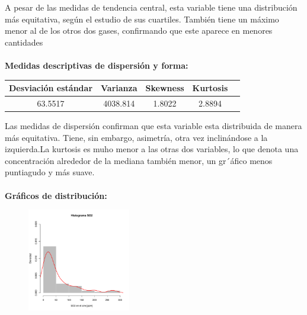 \documentclass[11pt]{article}
\begin{document}
A pesar de las medidas de tendencia central, esta variable tiene una distribución más equitativa, según el estudio de sus cuartiles. También tiene un máximo menor al de los otros dos gases, confirmando que este aparece en menores cantidades
\\
\\
\textbf{Medidas descriptivas de dispersión y forma:}

\begin{center}
\begin{tabular}{|c|c|c|c|c|}
    \hline
    Desviación estándar  & Varianza & Skewness & Kurtosis\\ \hline
    63.5517 & 4038.814 & 1.8022 & 2.8894\\
    \hline
\end{tabular}
\end{center}

Las medidas de dispersión confirman que esta variable esta distribuida de manera más equitativa. Tiene, sin embargo, asimetría, otra vez inclinándose a la izquierda.La kurtosis es muho menor a las otras dos variables, lo que denota una concentración alrededor de la mediana también menor, un gr´áfico menos puntiagudo y más suave.
\\
\\
\textbf{Gráficos de distribución:}
\\

\begin{figure}
    \centering
    \includegraphics[width = 0.4\textwidth]{histso2}
\end{figure}
\end{document}
